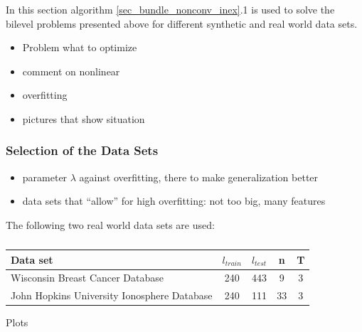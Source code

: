 In this section algorithm \ref{sec_bundle_nonconv_inex}.1 is used to solve the bilevel problems presented above for different synthetic and real world data sets.

\begin{itemize}
	\item Problem what to optimize
	\item comment on nonlinear 
	\item overfitting
	\item pictures that show situation
\end{itemize}


\subsubsection{Selection of the Data Sets}

\begin{itemize}
	\item parameter \(\lambda\) against overfitting, there to make generalization better
	\item data sets that ``allow'' for high overfitting: not too big, many features
\end{itemize}

The following two real world data sets are used:

\begin{center}
\begin{table}[H]%
	\begin{tabular}{lcccc}
		\hline
    Data set & \(l_{train}\) & \(l_{test}\) & n & T \\
		\hline
		Wisconsin Breast Cancer Database & 240 & 443 & 9 & 3 \\
		John Hopkins University Ionosphere Database & 240 & 111 & 33 & 3
	\end{tabular}
	\caption{}
\end{table}
\end{center}


Plots


